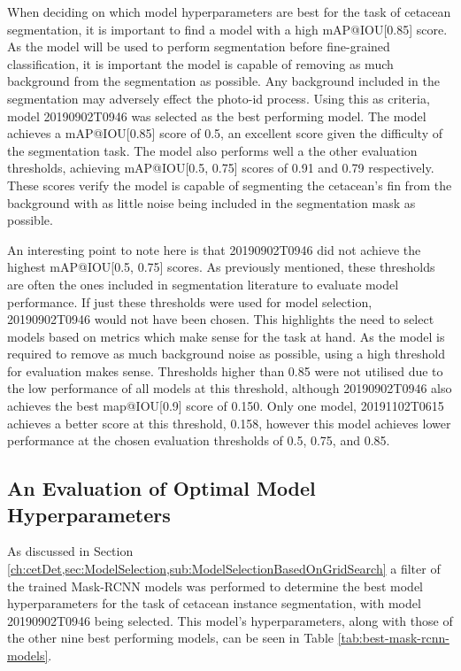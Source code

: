 When deciding on which model hyperparameters are best for the task of cetacean segmentation, it is important to find a model with a high mAP@IOU[0.85] score. As the model will be used to perform segmentation before fine-grained classification, it is important the model is capable of removing as much background from the segmentation as possible. Any background included in the segmentation may adversely effect the photo-id process. Using this as criteria, model 20190902T0946 was selected as the best performing model. The model achieves a mAP@IOU[0.85] score of 0.5, an excellent score given the difficulty of the segmentation task. The model also performs well a the other evaluation thresholds, achieving mAP@IOU[0.5, 0.75] scores of 0.91 and 0.79 respectively. These scores verify the model is capable of segmenting the cetacean's fin from the background with as little noise being included in the segmentation mask as possible.

An interesting point to note here is that 20190902T0946 did not achieve the highest mAP@IOU[0.5, 0.75] scores. As previously mentioned, these thresholds are often the ones included in segmentation literature to evaluate model performance. If just these thresholds were used for model selection, 20190902T0946 would not have been chosen. This highlights the need to select models based on metrics which make sense for the task at hand. As the model is required to remove as much background noise as possible, using a high threshold for evaluation makes sense. Thresholds higher than 0.85 were not utilised due to the low performance of all models at this threshold, although 20190902T0946 also achieves the best map@IOU[0.9] score of 0.150. Only one model, 20191102T0615 achieves a better score at this threshold, 0.158, however this model achieves lower performance at the chosen evaluation thresholds of 0.5, 0.75, and 0.85.

\subsection{An Evaluation of Optimal Model Hyperparameters}\label{ch:cetDet,sec:ModelSelection,sub:OptimalHyperparameters}

As discussed in Section \ref{ch:cetDet,sec:ModelSelection,sub:ModelSelectionBasedOnGridSearch} a filter of the trained Mask-RCNN models was performed to determine the best model hyperparameters for the task of cetacean instance segmentation, with model 20190902T0946 being selected. This model's hyperparameters, along with those of the other nine best performing models, can be seen in Table \ref{tab:best-mask-rcnn-models}.

